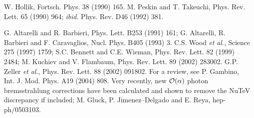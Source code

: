 \begin{thebibliography}{999}
 W. Hollik, Fortsch. Phys. 38 (1990) 165. 
%
 M. Peskin and T. Takeuchi,
Phys. Rev. Lett. 65 (1990) 964; {\it ibid.} Phys. Rev. D46 (1992) 381.

G. Altarelli and R. Barbieri, Phys. Lett. B253 (1991) 161; 
G. Altarelli, R. Barbieri and F. Caravaglios, Nucl. Phys. B405 (1993) 3.
% 
 C.S. Wood {\it et al.}, Science 275 (1997) 1759;
S.C. Bennett and C.E. Wieman, Phys. Rev. Lett. 82 (1999) 2484;
M. Kuchiev and V. Flambaum, Phys. Rev. Lett. 89 (2002) 283002. 
%
 G.P. Zeller {\it et al.}, Phys. Rev. Lett. 88 (2002) 091802.
%
 For a review, see P. Gambino, 
Int. J. Mod. Phys. A19 (2004) 808. 
%
 Very recently, new ${\cal O}(\alpha)$ photon bremsstrahlung 
corrections have been calculated and shown to remove the NuTeV discrepancy
if included; M. Gluck, P. Jimenez--Delgado  and E. Reya, hep-ph/0503103.  


\end{thebibliography}
